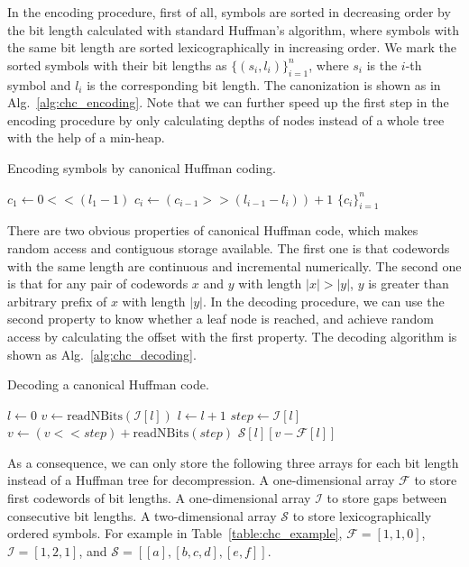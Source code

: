\documentclass[a4paper,11pt]{article}
\begin{document}
In the encoding procedure, first of all, symbols are sorted in decreasing order by the bit length calculated with standard Huffman's algorithm, where symbols with the same bit length are sorted lexicographically in increasing order. We mark the sorted symbols with their bit lengths as $\{(s_i, l_i)\}_{i=1}^n$, where $s_i$ is the $i$-th symbol and $l_i$ is the corresponding bit length. The canonization is shown as in Alg.~\ref{alg:chc_encoding}. Note that we can further speed up the first step in the encoding procedure by only calculating depths of nodes instead of a whole tree with the help of a min-heap.

\begin{algorithm}[h] 
\caption{Encoding symbols by canonical Huffman coding.} 
\begin{algorithmic}[1]
\State $c_1 \leftarrow 0 << (l_1 - 1)$
\State $c_i \leftarrow (c_{i-1} >> (l_{i-1} - l_i)) + 1$
\EndFor
\State \Return $\{c_i\}_{i=1}^n$
\end{algorithmic} 
\label{alg:chc_encoding}
\end{algorithm}

There are two obvious properties of canonical Huffman code, which makes random access and contiguous storage available. The first one is that codewords with the same length are continuous and incremental numerically. The second one is that for any pair of codewords $x$ and $y$ with length $|x| > |y|$, $y$ is greater than arbitrary prefix of $x$ with length $|y|$. In the decoding procedure, we can use the second property to know whether a leaf node is reached, and achieve random access by calculating the offset with the first property. The decoding algorithm is shown as Alg.~\ref{alg:chc_decoding}. 

\begin{algorithm}[h] 
\caption{Decoding a canonical Huffman code.} 
\begin{algorithmic}[1]
\State $l \leftarrow 0$
\State $v \leftarrow \mathrm{readNBits}(\mathcal{I}[l])$
\State $l \leftarrow l + 1$
\State $step \leftarrow \mathcal{I}[l]$
\State $v \leftarrow (v << step) + \mathrm{readNBits}(step)$
\EndWhile
\State \Return $\mathcal{S}[l][v - \mathcal{F}[l]]$
\end{algorithmic} 
\label{alg:chc_decoding}
\end{algorithm}

As a consequence, we can only store the following three arrays for each bit length instead of a Huffman tree for decompression. A one-dimensional array $\mathcal{F}$ to store first codewords of bit lengths. A one-dimensional array $\mathcal{I}$ to store gaps between consecutive bit lengths. A two-dimensional array $\mathcal{S}$ to store lexicographically ordered symbols. For example in Table~\ref{table:chc_example}, $\mathcal{F} = [1, 1, 0]$, $\mathcal{I} = [1, 2, 1]$, and $\mathcal{S} = [[a], [b, c, d], [e, f]]$.
\end{document}

